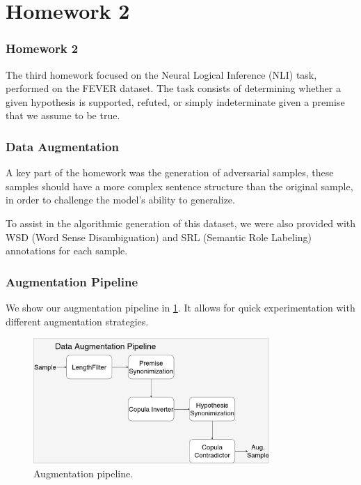 \documentclass[english, xcolor={table,usenames}]{beamer}
\begin{document}
\section{Homework 2}

\begin{frame}
  \frametitle{Homework 2}

  The third homework focused on the \alert{Neural Logical Inference} (NLI) task, performed
  on the FEVER dataset. The task consists of determining whether a given hypothesis is
  \alert{supported}, \alert{refuted}, or simply \alert{indeterminate} given a premise that we assume to be true.
\end{frame}

\begin{frame}
  \frametitle{Data Augmentation}

  A key part of the homework was the generation of \alert{adversarial} samples, these samples
  should have a more complex sentence structure than the original sample, in order to
  challenge the model's ability to \alert{generalize}.

  To assist in the algorithmic generation of this dataset, we were also provided with
  WSD (Word Sense Disambiguation) and SRL (Semantic Role Labeling) annotations for
  each sample.
\end{frame}

\begin{frame}
  \frametitle{Augmentation Pipeline}

  We show our augmentation pipeline in \cref{fig:pipeline}. It allows for quick experimentation
  with different augmentation strategies.

  \begin{figure}[H]
    \centering
    \includegraphics[width=0.8\textwidth]{images/pipeline.png}
    \caption{Augmentation pipeline.}
    \label{fig:pipeline}
  \end{figure}

\end{frame}
\end{document}
